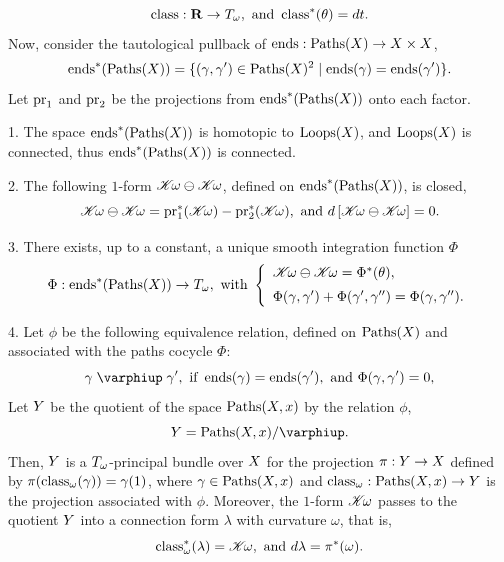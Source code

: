 \begin{article}
  $$%
  \class : \RR \to \Torus_\omega, \text{ and } \class^*(\theta) = dt.
  $$%
  Now,
  consider the tautological pullback of
  $\operatorname{ends} : \operatorname{Paths}(X) \to X \times X$,
  $$%
  \ends^*(\Paths(\X)) = \{ (\gamma,\gamma') \in \Paths(\X)^2 \mid \ends(\gamma) = \ends(\gamma') \}.
  $$%
  Let $\mathrm{pr}_1$ and $\mathrm{pr}_2$ be the projections from $\operatorname{ends}^*(\operatorname{Paths}(X))$ onto each factor.
  \begin{center}
  \end{center}

  1. The space $\operatorname{ends}^*(\operatorname{Paths}(X))$ is homotopic to $\operatorname{Loops}(X)$,
  and $\operatorname{Loops}(X)$ is connected,
  thus $\operatorname{ends}^*(\operatorname{Paths}(X))$ is connected.
  
  2. The following $1$-form $\mathscr{K}\!\omega \ominus \mathscr{K}\!\omega$,
  defined on $\operatorname{ends}^*(\operatorname{Paths}(X))$,
  is closed,
  $$%
  \CHK\!\omega \ominus \CHK\!\omega = \pr_1^*(\CHK\!\omega) - \pr_2^*(\CHK\!\omega), \text{ and } d\left[ \CHK\!\omega \ominus \CHK\!\omega \right] = 0.
  $$%
  
  3. There exists,
  up to a constant,
  a unique smooth integration function $\Phi$
  $$%
  \Phi : \ends^*(\Paths(\X)) \to \Torus_\omega, \text{ with }
  \left\{
  \begin{array}{l}
    \CHK\!\omega \ominus \CHK\!\omega = \Phi^*(\theta), \\
    \vspace{-7pt} \\
    \Phi(\gamma,\gamma') + \Phi(\gamma',\gamma'') = \Phi(\gamma,\gamma'').
  \end{array}
  \right.
  $$%
  
  4. Let $\phi$ be the following equivalence relation,
  defined on $\operatorname{Paths}(X)$ and associated with
  the paths cocycle $\Phi$:
  \begin{equation}
    \renewcommand{\theequation}{$\heartsuit$}
    \gamma \mathrel{\phi} \gamma', \text{ if } \ends(\gamma) = \ends(\gamma'), \text{ and } \Phi(\gamma,\gamma') = 0,
  \end{equation}
  Let $Y$ be the quotient of the space $\operatorname{Paths}(X,x)$ by the relation $\phi$,
  $$%
  \Y = \Paths(\X,x)/\phi.
  $$%
  Then,
  $Y$ is a $T_\omega$-principal bundle over $X$ for the projection $\pi : Y \to X$ defined by $\pi(\operatorname{class}_\omega(\gamma)) = \gamma(1)$,
  where $\gamma \in \operatorname{Paths}(X,x)$ and $\operatorname{class}_\omega : \operatorname{Paths}(X,x) \to Y$ is the projection associated with $\phi$.
  Moreover,
  the $1$-form $\mathscr{K}\!\omega$ passes to the quotient $Y$ into a connection form $\lambda$ with curvature $\omega$,
  that is,
  $$%
  \class_\omega^*(\lambda) = \CHK\!\omega, \text{ and } d\lambda = \pi^*(\omega).
  $$%
  

\end{article}
